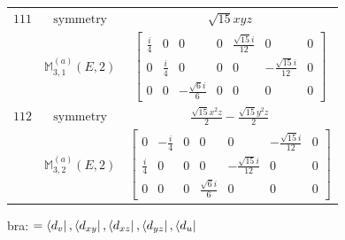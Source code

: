 \documentclass[fleqn,8pt,landscape]{jsarticle}
\begin{document}
\begin{longtable}{ccc}
$ 111 $ & $ \text{symmetry} $ & $ \sqrt{15} x y z $ \\
$  $ & $ \mathbb{M}_{3,1}^{(a)}(E,2) $ & $ \begin{bmatrix} \frac{i}{4} & 0 & 0 & 0 & \frac{\sqrt{15} i}{12} & 0 & 0 \\ 0 & \frac{i}{4} & 0 & 0 & 0 & - \frac{\sqrt{15} i}{12} & 0 \\ 0 & 0 & - \frac{\sqrt{6} i}{6} & 0 & 0 & 0 & 0 \end{bmatrix} $ \\ \hline
$ 112 $ & $ \text{symmetry} $ & $ \frac{\sqrt{15} x^{2} z}{2} - \frac{\sqrt{15} y^{2} z}{2} $ \\
$  $ & $ \mathbb{M}_{3,2}^{(a)}(E,2) $ & $ \begin{bmatrix} 0 & - \frac{i}{4} & 0 & 0 & 0 & - \frac{\sqrt{15} i}{12} & 0 \\ \frac{i}{4} & 0 & 0 & 0 & - \frac{\sqrt{15} i}{12} & 0 & 0 \\ 0 & 0 & 0 & \frac{\sqrt{6} i}{6} & 0 & 0 & 0 \end{bmatrix} $ \\ \hline
\end{longtable}
bra: $=\bra{d_{v}}, \bra{d_{xy}}, \bra{d_{xz}}, \bra{d_{yz}}, \bra{d_{u}}$
\end{document}

